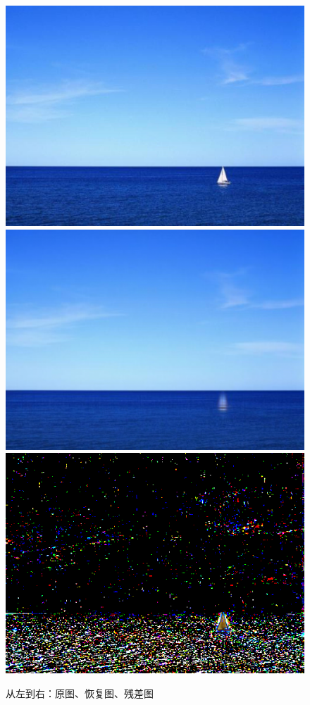 \documentclass{article}
\begin{document}
    \begin{figure}[h]
    	\includegraphics[scale=0.56]{../figures/test-7.png}
    	\quad
    	\includegraphics[scale=0.28]{../figures/A-0.png}
    	\quad
    	\includegraphics[scale=0.28]{../figures/E-0.png}
    	\caption{从左到右：原图、恢复图、残差图}
    \end{figure}
    
\end{document}

